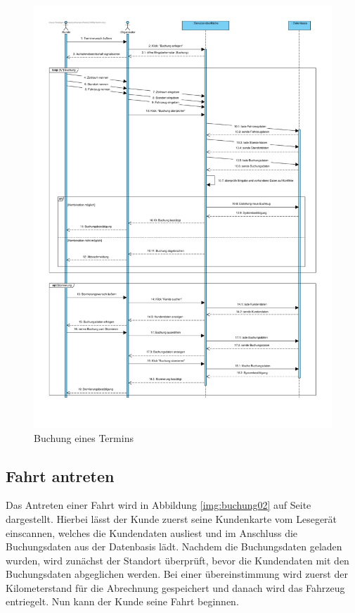 \newpage

\begin{figure}[!ht]
    \centering
    \includegraphics[width=\textwidth, height=\textheight-4cm]{Bilder/Diagramme/SD_Buchungsvorgang_01.pdf}
    \caption{Buchung eines Termins}
    \label{img:buchung01}
\end{figure}


\clearpage

\subsection{Fahrt antreten}

Das Antreten einer Fahrt wird in Abbildung \ref{img:buchung02} auf Seite \pageref{img:buchung02} dargestellt. Hierbei lässt der Kunde zuerst seine Kundenkarte vom Lesegerät einscannen, welches die Kundendaten ausliest und im Anschluss die Buchungsdaten aus der Datenbasis lädt. Nachdem die Buchungsdaten geladen wurden, wird zunächst der Standort überprüft, bevor die Kundendaten mit den Buchungsdaten abgeglichen werden. Bei einer übereinstimmung wird zuerst der Kilometerstand für die Abrechnung gespeichert und danach wird das Fahrzeug entriegelt. Nun kann der Kunde seine Fahrt beginnen. 


